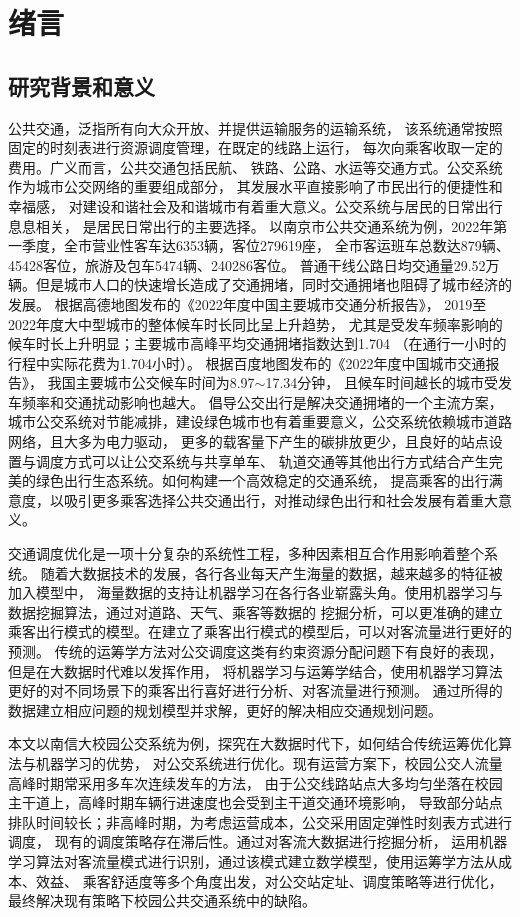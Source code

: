 \section{绪言}
\subsection{研究背景和意义}
公共交通，泛指所有向大众开放、并提供运输服务的运输系统，
该系统通常按照固定的时刻表进行资源调度管理，在既定的线路上运行，
每次向乘客收取一定的费用。广义而言，公共交通包括民航、
铁路、公路、水运等交通方式。公交系统作为城市公交网络的重要组成部分，
其发展水平直接影响了市民出行的便捷性和幸福感，
对建设和谐社会及和谐城市有着重大意义。公交系统与居民的日常出行息息相关，
是居民日常出行的主要选择。
以南京市公共交通系统为例，2022年第一季度，全市营业性客车达6353辆，客位279619座，
全市客运班车总数达879辆、45428客位，旅游及包车5474辆、240286客位。
普通干线公路日均交通量29.52万辆\cite{njjt}。但是城市人口的快速增长造成了交通拥堵，同时交通拥堵也阻碍了城市经济的发展。
根据高德地图发布的《2022年度中国主要城市交通分析报告\cite{x1}》，
2019至2022年度大中型城市的整体候车时长同比呈上升趋势，
尤其是受发车频率影响的候车时长上升明显；主要城市高峰平均交通拥堵指数达到1.704
（在通行一小时的行程中实际花费为1.704小时）。
根据百度地图发布的《2022年度中国城市交通报告\cite{bd}》，
我国主要城市公交候车时间为8.97$ \sim $17.34分钟，
且候车时间越长的城市受发车频率和交通扰动影响也越大。
倡导公交出行是解决交通拥堵的一个主流方案，
城市公交系统对节能减排，建设绿色城市也有着重要意义，公交系统依赖城市道路网络，且大多为电力驱动，
更多的载客量下产生的碳排放更少，且良好的站点设置与调度方式可以让公交系统与共享单车、
轨道交通等其他出行方式结合产生完美的绿色出行生态系统。如何构建一个高效稳定的交通系统，
提高乘客的出行满意度，以吸引更多乘客选择公共交通出行，对推动绿色出行和社会发展有着重大意义。


交通调度优化是一项十分复杂的系统性工程，多种因素相互合作用影响着整个系统。
随着大数据技术的发展，各行各业每天产生海量的数据，越来越多的特征被加入模型中，
海量数据的支持让机器学习在各行各业崭露头角。使用机器学习与数据挖掘算法，通过对道路、天气、乘客等数据的
挖掘分析，可以更准确的建立乘客出行模式的模型。在建立了乘客出行模式的模型后，可以对客流量进行更好的预测。
传统的运筹学方法对公交调度这类有约束资源分配问题下有良好的表现，但是在大数据时代难以发挥作用，
将机器学习与运筹学结合，使用机器学习算法更好的对不同场景下的乘客出行喜好进行分析、对客流量进行预测。
通过所得的数据建立相应问题的规划模型并求解，更好的解决相应交通规划问题。


本文以南信大校园公交系统为例，探究在大数据时代下，如何结合传统运筹优化算法与机器学习的优势，
对公交系统进行优化。现有运营方案下，校园公交人流量高峰时期常采用多车次连续发车的方法，
由于公交线路站点大多均匀坐落在校园主干道上，高峰时期车辆行进速度也会受到主干道交通环境影响，
导致部分站点排队时间较长；非高峰时期，为考虑运营成本，公交采用固定弹性时刻表方式进行调度，
现有的调度策略存在滞后性。通过对客流大数据进行挖掘分析，
运用机器学习算法对客流量模式进行识别，通过该模式建立数学模型，使用运筹学方法从成本、效益、
乘客舒适度等多个角度出发，对公交站定址、调度策略等进行优化，
最终解决现有策略下校园公共交通系统中的缺陷。


